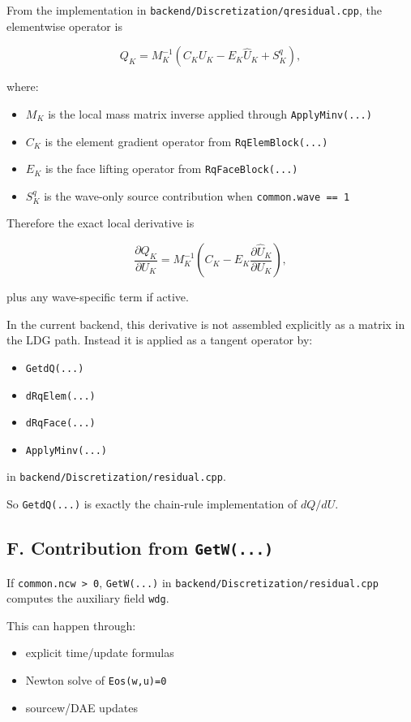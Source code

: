 \documentclass[11pt]{article}
\begin{document}
From the implementation in \texttt{backend/Discretization/qresidual.cpp}, the
elementwise operator is

\[
Q_K = M_K^{-1}\left(C_K U_K - E_K \hat U_K + S^q_K\right),
\]

where:

\begin{itemize}[leftmargin=*]
\item $M_K$ is the local mass matrix inverse applied through
\texttt{ApplyMinv(...)}
\item $C_K$ is the element gradient operator from \texttt{RqElemBlock(...)}
\item $E_K$ is the face lifting operator from \texttt{RqFaceBlock(...)}
\item $S^q_K$ is the wave-only source contribution when
\texttt{common.wave == 1}
\end{itemize}

Therefore the exact local derivative is

\[
\frac{\partial Q_K}{\partial U_K}
=
M_K^{-1}\left(
C_K - E_K \frac{\partial \hat U_K}{\partial U_K}
\right),
\]

plus any wave-specific term if active.

In the current backend, this derivative is not assembled explicitly as a
matrix in the LDG path. Instead it is applied as a tangent operator by:

\begin{itemize}[leftmargin=*]
\item \texttt{GetdQ(...)}
\item \texttt{dRqElem(...)}
\item \texttt{dRqFace(...)}
\item \texttt{ApplyMinv(...)}
\end{itemize}

in \texttt{backend/Discretization/residual.cpp}.

So \texttt{GetdQ(...)} is exactly the chain-rule implementation of
$dQ/dU$.

\subsection*{F. Contribution from \texttt{GetW(...)}}

If \texttt{common.ncw > 0}, \texttt{GetW(...)} in
\texttt{backend/Discretization/residual.cpp} computes the auxiliary field
\texttt{wdg}.

This can happen through:

\begin{itemize}[leftmargin=*]
\item explicit time/update formulas
\item Newton solve of \texttt{Eos(w,u)=0}
\item sourcew/DAE updates
\end{itemize}
\end{document}
